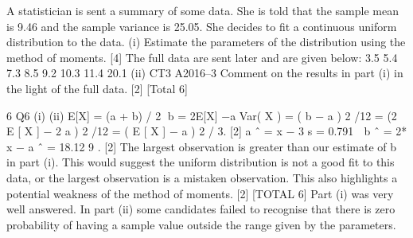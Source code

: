 \documentclass[a4paper,12pt]{article}
\begin{document}
A statistician is sent a summary of some data. She is told that the sample mean is
9.46 and the sample variance is 25.05. She decides to fit a continuous uniform
distribution to the data.
(i)
Estimate the parameters of the distribution using the method of moments. [4]
The full data are sent later and are given below:
3.5 5.4 7.3 8.5 9.2 10.3 11.4 20.1
(ii)
CT3 A2016–3
Comment on the results in part (i) in the light of the full data.
[2]
[Total 6]



6
Q6
(i)
(ii)
E[X] = (a + b) / 2 b = 2E[X] −a
Var( X ) = ( b − a ) 2 /12 = (2 E [ X ] − 2 a ) 2 /12 = ( E [ X ] − a ) 2 / 3. [2]
a ˆ = x − 3 s = 0.791  b ˆ = 2* x − a ˆ = 18.12 9 . [2]
The largest observation is greater than our estimate of b in part (i). This would
suggest the uniform distribution is not a good fit to this data, or the largest
observation is a mistaken observation. This also highlights a potential
weakness of the method of moments.
[2]
[TOTAL 6]
Part (i) was very well answered. In part (ii) some candidates failed to
recognise that there is zero probability of having a sample value outside the
range given by the parameters.
\end{document}

